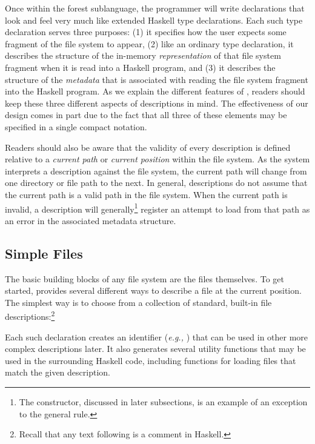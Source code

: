\documentclass[natbib]{sigplanconf}
\begin{document}
Once within the forest sublanguage, the programmer will write declarations
that look and feel very much like extended Haskell type declarations.
Each such type declaration serves three purposes: (1) it specifies how the user
expects some fragment of the file system to appear, (2) like an ordinary type
declaration, it describes the structure of the in-memory {\em representation} of that 
file system fragment when it is read into a Haskell program, and (3) it describes 
the structure of the {\em metadata} that is associated with reading the file system
fragment into the Haskell program.  As we explain the different features of \forest{}, 
readers should keep these three different aspects of \forest{} descriptions in mind.  
The effectiveness of our design comes in part due to the fact that all three of these 
elements may be specified in a single compact notation.  

Readers should also be aware
that the validity of every description is defined relative to a 
{\em current path} or {\em current position} within the file system.  As 
the system interprets a description against the file system, the current path
will change from one directory or file path to the next.  In general, descriptions
do not assume that the current path is a valid path in the file system.  When the current
path is invalid, a description will generally\footnote{The  constructor,
discussed in later subsections, is an example of an exception to the general rule.} 
register an attempt to load from that
path as an error in the associated metadata structure.

\subsection{Simple Files}
\label{sec:basics}

The basic building blocks of any file system are the files themselves.  To get started,
\forest{} provides several different ways to describe a file at the current position.  The simplest
way is to choose from a collection of standard, built-in file descriptions:\footnote{Recall that
any text following \cd{--} is a comment in Haskell.} 
\noindent
\begin{code}
[forest| 
  type MyText = File Ptext   -- a text file
  type MyBin = File Pbin     -- a binary file
  type Whatever = File Pany  -- any file at all
|]
\end{code}
Each such declaration creates an identifier ({\it e.g.,} ) that can be used in other
more complex descriptions later.  It also generates several utility functions that may
be used in the surrounding Haskell code, including functions 
for loading files that match the given description.  
\end{document}
